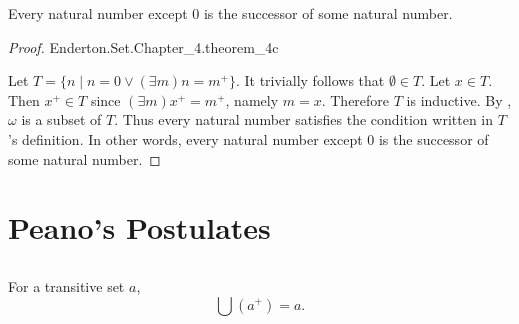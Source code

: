 \documentclass{report}
\begin{document}
\begin{theorem}[4C]

  Every natural number except $0$ is the successor of some natural number.

\end{theorem}

\begin{proof}

    {Enderton.Set.Chapter\_4.theorem\_4c}

  Let $T = \{n \mid n = 0 \lor (\exists m) n = m^+\}$.
  It trivially follows that $\emptyset \in T$.
  Let $x \in T$.
  Then $x^+ \in T$ since $(\exists m) x^+ = m^+$, namely $m = x$.
  Therefore $T$ is inductive.
  By , $\omega$ is a subset of $T$.
  Thus every natural number satisfies the condition written in $T$'s definition.
  In other words, every natural number except $0$ is the successor of some
    natural number.

\end{proof}

\section{Peano's Postulates}%

\subsection{}%

\begin{theorem}[4E]

  For a transitive set $a$, $$\bigcup \left(a^+\right) = a.$$

\end{theorem}
\end{document}
